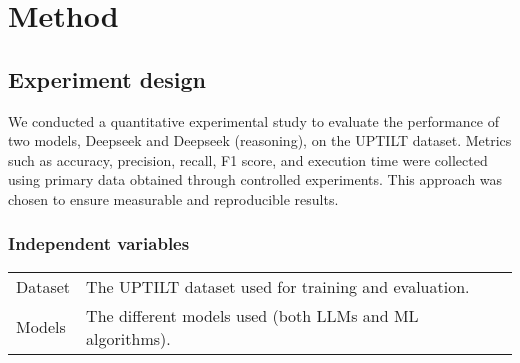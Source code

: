 \section{Method}
%
%
%

\subsection{Experiment design}
%
%
%
We conducted a quantitative experimental study to evaluate the performance of two
models, Deepseek and Deepseek (reasoning), on the UPTILT dataset. Metrics such
as accuracy, precision, recall, F1 score, and execution time were collected
using primary data obtained through controlled experiments. This approach was chosen
to ensure measurable and reproducible results.

\subsubsection{Independent variables}
%
%
\begin{center}
    \begin{tabular}{| l | l |}
        Dataset & The UPTILT dataset used for training and evaluation.     \\
        Models  & The different models used (both LLMs and ML algorithms). \\
    \end{tabular}
\end{center}

